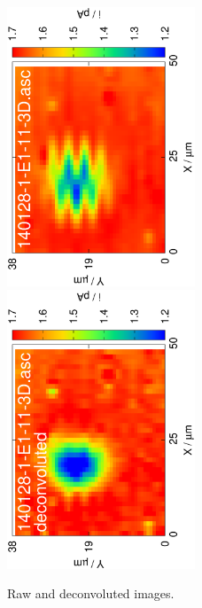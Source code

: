 \documentclass[a4paper, 11pt]{article}
\begin{document}
\begin{figure}
\centering
\includegraphics[width=0.5\textwidth, angle=-90]{11.eps}
\includegraphics[width=0.5\textwidth, angle=-90]{11_deconvoluted.eps}
\caption{Raw and deconvoluted images.}
\label{fig:results}
\end{figure}

{}

\end{document}
